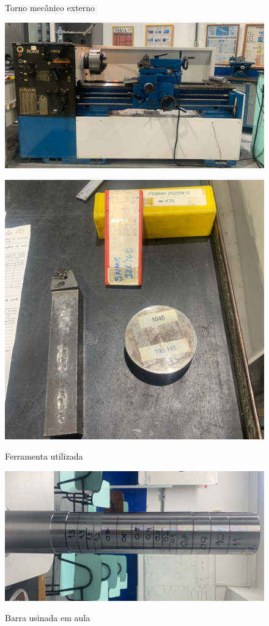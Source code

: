 \documentclass[deposito, acronym, symbols]{fei}
\begin{document}
\begin{figure}[!htp]
  \centering
  \begin{minipage}{0.4\textwidth}
    \centering
    \caption{Torno mecânico externo}
    \includegraphics[width=1.1\linewidth]{Imagens/Exp01_torno.jpeg}
    \label{fig:Torno}
  \end{minipage}
  \hfill
  \begin{minipage}{0.4\textwidth}
        \caption{Ferramenta utilizada}
    \includegraphics[width=0.8\linewidth]{Imagens/Exp01_ferramenta.jpeg}
    \label{fig:fera}
  \end{minipage}
\end{figure}


\begin{figure}[!htp]
    \centering
    \caption{Barra usinada em aula}
    \includegraphics[width=0.6\linewidth]{Imagens/Exp01_barratorenada.jpeg}
    \label{fig:barra}
\end{figure}
\end{document}
